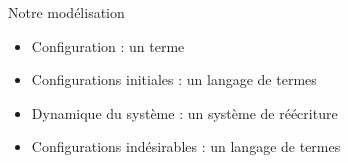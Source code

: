 \begin{frame}{Notre modélisation}
  \begin{block}{}
    \begin{itemize}[<+->]
    \item Configuration : un terme
    \item Configurations initiales : un langage de termes
    \item Dynamique du système : un système de réécriture
    \item Configurations indésirables : un langage de termes
    \end{itemize}
  \end{block}
\end{frame}